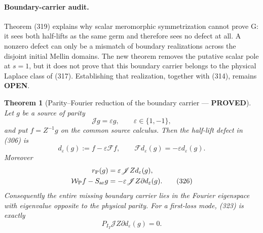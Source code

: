 \documentclass[11pt]{article}
\newtheorem{theorem}{Theorem}
\newcommand{\PROVED}{\textcolor{green!45!black}{\textbf{PROVED}}}
\newcommand{\OPEN}{\textcolor{red!70!black}{\textbf{OPEN}}}
\begin{document}
\paragraph{Boundary-carrier audit.}
Theorem (319) explains why scalar meromorphic symmetrization cannot prove
G: it sees both half-lifts as the same germ and therefore sees no defect at
all.  A nonzero defect can only be a mismatch of boundary realizations
across the disjoint initial Mellin domains.  The new theorem removes the
putative scalar pole at $s=1$, but it does not prove that this boundary
carrier belongs to the physical Laplace class of (317).  Establishing that
realization, together with (314), remains \OPEN{}.

\begin{theorem}[Parity--Fourier reduction of the boundary carrier --- \PROVED]
Let $g$ be a source of parity
\begin{equation}
 \mathscr Jg=\varepsilon g,
 \qquad \varepsilon\in\{1,-1\},                       \tag{324}
\end{equation}
and put $f=Z^{-1}g$ on the common source calculus.  Then the half-lift defect
in (306) is
\begin{equation}
 d_{\varepsilon}(g):=f-\varepsilon\mathcal Ff,
 \qquad
 \mathcal Fd_{\varepsilon}(g)=-\varepsilon
             d_{\varepsilon}(g).                     \tag{325}
\end{equation}
Moreover
\begin{align}
 r_{\rm P}(g)&=\varepsilon\mathscr JZ d_{\varepsilon}(g),\notag\\
 \mathcal W_{\rm P}f-S_{\rm ar}g
 &=-\varepsilon\mathscr JZ\partial d_{\varepsilon}(g).
                                                               \tag{326}
\end{align}
Consequently the entire missing boundary carrier lies in the Fourier
eigenspace with eigenvalue opposite to the physical parity.  For a first-loss
mode, (323) is exactly
\[
 P_{I_T}\mathscr JZ\partial d_{\varepsilon}(g)=0.
\]
\end{theorem}
\end{document}
